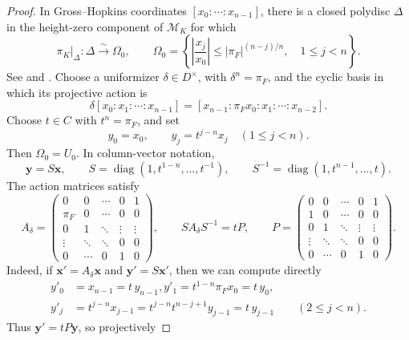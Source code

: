 \documentclass[11pt]{article}
\theoremstyle{definition}
\newcommand{\cM}{\mathcal M}
\begin{document}
\begin{proof}
In Gross--Hopkins coordinates \([x_0:\cdots:x_{n-1}]\),
there is a closed polydisc \(\Delta\) in the height-zero
component of \(\cM_K\) for which
\begin{equation*}
 \pi_K|_\Delta:\Delta\xrightarrow{\sim}\Omega_0,
 \qquad
 \Omega_0=\left\{\left|\frac{x_j}{x_0}\right|
           \leq|\pi_F|^{(n-j)/n},\quad 1\leq j<n\right\}.
\end{equation*}
See \cite[Lemma~23.14 and Corollary~23.15]{GrossHopkinsBundles}
and \cite[\S3.1, equations~(3.1.8)--(3.1.10)]{ShethLocallyAnalytic}.
Choose a uniformizer \(\delta\in D^\times\), with
\(\delta^n=\pi_F\), and the cyclic basis in which its
projective action is
\begin{equation*}
 \delta[x_0:x_1:\cdots:x_{n-1}]
   =[x_{n-1}:\pi_F x_0:x_1:\cdots:x_{n-2}].
\end{equation*}
Choose \(t\in C\) with \(t^n=\pi_F\), and set
\begin{equation*}
 y_0=x_0,\qquad y_j=t^{j-n}x_j\quad(1\leq j<n).
\end{equation*}
Then \(\Omega_0=U_0\).  In column-vector notation,
\[
 \mathbf y=S\mathbf x,\qquad
 S=\operatorname{diag}(1,t^{1-n},\ldots,t^{-1}),\qquad
 S^{-1}=\operatorname{diag}(1,t^{n-1},\ldots,t).
\]
The action matrices satisfy
\[
 A_\delta=
 \begin{pmatrix}
  0&0&\cdots&0&1\\
  \pi_F&0&\cdots&0&0\\
  0&1&\ddots&\vdots&\vdots\\
  \vdots&\ddots&\ddots&0&0\\
  0&\cdots&0&1&0
 \end{pmatrix},
 \qquad
 S A_\delta S^{-1}=tP,\qquad
 P=
 \begin{pmatrix}
  0&0&\cdots&0&1\\
  1&0&\cdots&0&0\\
  0&1&\ddots&\vdots&\vdots\\
  \vdots&\ddots&\ddots&0&0\\
  0&\cdots&0&1&0
 \end{pmatrix}.
\]
Indeed, if \(\mathbf x'=A_\delta\mathbf x\) and
\(\mathbf y'=S\mathbf x'\), then we can compute directly
\begin{align*}
 y'_0&=x_{n-1}=t\,y_{n-1},
 y'_1=t^{1-n}\pi_F x_0=t\,y_0,\\
 y'_j&=t^{j-n}x_{j-1}
       =t^{j-n}t^{n-j+1}y_{j-1}
       =t\,y_{j-1}\qquad(2\leq j<n).
\end{align*}
Thus \(\mathbf y'=tP\mathbf y\), so projectively

\end{proof}
\end{document}
